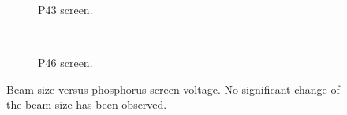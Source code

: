 \begin{figure}[!ht]
	\begin{subfigure}[t]{0.5\textwidth}
		
		\caption{P43 screen.}
		\label{}
	\end{subfigure}
	~
	\begin{subfigure}[t]{0.5\textwidth}
		
		\caption{P46 screen.}
		\label{}
	\end{subfigure}
	\caption[Beam size versus phosphorus screen voltage.]{Beam size versus phosphorus screen voltage. No significant change of the beam size has been observed.}
	\label{chap4:P_size}
\end{figure}
